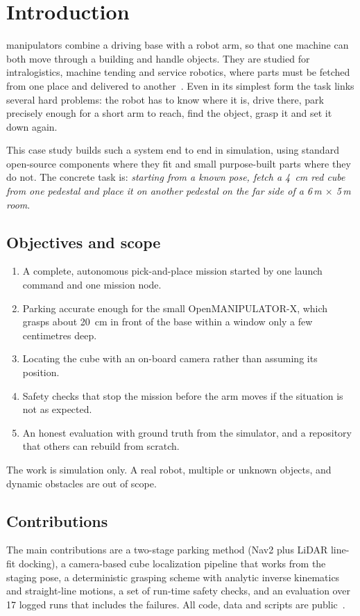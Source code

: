 \documentclass[journal]{IEEEtran}
\begin{document}
\section{Introduction}

 manipulators combine a driving base with a robot arm, so that one machine can both move through a building and handle objects. They are studied for intralogistics, machine tending and service robotics, where parts must be fetched from one place and delivered to another~\cite{hvilshoj2012aimm}. Even in its simplest form the task links several hard problems: the robot has to know where it is, drive there, park precisely enough for a short arm to reach, find the object, grasp it and set it down again.

This case study builds such a system end to end in simulation, using standard open-source components where they fit and small purpose-built parts where they do not. The concrete task is: \emph{starting from a known pose, fetch a \SI{4}{cm} red cube from one pedestal and place it on another pedestal on the far side of a 6\,m $\times$ 5\,m room}.

\subsection{Objectives and scope}
\begin{enumerate}
  \item A complete, autonomous pick-and-place mission started by one launch command and one mission node.
  \item Parking accurate enough for the small OpenMANIPULATOR-X, which grasps about \SI{20}{cm} in front of the base within a window only a few centimetres deep.
  \item Locating the cube with an on-board camera rather than assuming its position.
  \item Safety checks that stop the mission before the arm moves if the situation is not as expected.
  \item An honest evaluation with ground truth from the simulator, and a repository that others can rebuild from scratch.
\end{enumerate}
The work is simulation only. A real robot, multiple or unknown objects, and dynamic obstacles are out of scope.

\subsection{Contributions}
The main contributions are a two-stage parking method (Nav2 plus LiDAR line-fit docking), a camera-based cube localization pipeline that works from the staging pose, a deterministic grasping scheme with analytic inverse kinematics and straight-line motions, a set of run-time safety checks, and an evaluation over 17 logged runs that includes the failures. All code, data and scripts are public~\cite{repo}.
\end{document}
